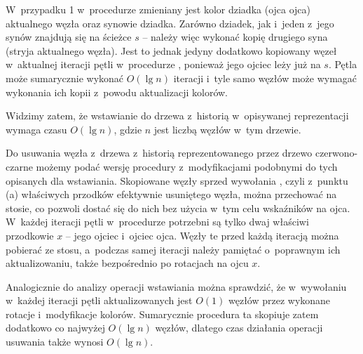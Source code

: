 W~przypadku 1 w~procedurze  zmieniany jest kolor dziadka (ojca ojca) aktualnego węzła oraz synowie dziadka.
Zarówno dziadek, jak i~jeden z~jego synów znajdują się na ścieżce $s$ -- należy więc wykonać kopię drugiego syna (stryja aktualnego węzła).
Jest to jednak jedyny dodatkowo kopiowany węzeł w~aktualnej iteracji pętli w~procedurze , ponieważ jego ojciec leży już na $s$.
Pętla może sumarycznie wykonać $O(\lg n)$ iteracji i~tyle samo węzłów może wymagać wykonania ich kopii z~powodu aktualizacji kolorów.

Widzimy zatem, że wstawianie do drzewa z~historią w~opisywanej reprezentacji wymaga czasu $O(\lg n)$, gdzie $n$ jest liczbą węzłów w~tym drzewie.

Do usuwania węzła z~drzewa z~historią reprezentowanego przez drzewo czerwono-czarne możemy podać wersję procedury  z~modyfikacjami podobnymi do tych opisanych dla wstawiania.
Skopiowane węzły sprzed wywołania , czyli z~punktu (a) właściwych przodków efektywnie usuniętego węzła, można przechować na stosie, co pozwoli dostać się do nich bez użycia w~tym celu wskaźników na ojca.
W~każdej iteracji pętli  w~procedurze  potrzebni są tylko dwaj właściwi przodkowie $x$ -- jego ojciec i~ojciec ojca.
Węzły te przed każdą iteracją można pobierać ze stosu, a~podczas samej iteracji należy pamiętać o~poprawnym ich aktualizowaniu, także bezpośrednio po rotacjach na ojcu $x$.

Analogicznie do analizy operacji wstawiania można sprawdzić, że w~wywołaniu  w~każdej iteracji pętli aktualizowanych jest $O(1)$ węzłów przez wykonane rotacje i~modyfikacje kolorów.
Sumarycznie procedura ta skopiuje zatem dodatkowo co najwyżej $O(\lg n)$ węzłów, dlatego czas działania operacji usuwania także wynosi $O(\lg n)$.
